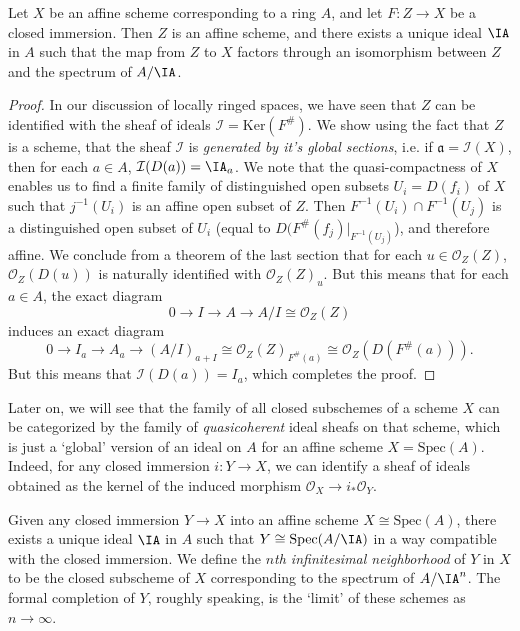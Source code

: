 \begin{theorem}
    Let $X$ be an affine scheme corresponding to a ring $A$, and let $F: Z \to X$ be a closed immersion. Then $Z$ is an affine scheme, and there exists a unique ideal $\IA$ in $A$ such that the map from $Z$ to $X$ factors through an isomorphism between $Z$ and the spectrum of $A/\IA$.
\end{theorem}
\begin{proof}
    In our discussion of locally ringed spaces, we have seen that $Z$ can be identified with the sheaf of ideals $\mathcal{I} = \text{Ker}(F^\#)$. We show using the fact that $Z$ is a scheme, that the sheaf $\mathcal{I}$ is \emph{generated by it's global sections}, i.e. if $\mathfrak{a} = \mathcal{I}(X)$, then for each $a \in A$, $\mathcal{I}(D(a)) = \IA_a$. We note that the quasi-compactness of $X$ enables us to find a finite family of distinguished open subsets $U_i = D(f_i)$ of $X$ such that $j^{-1}(U_i)$ is an affine open subset of $Z$. Then $F^{-1}(U_i) \cap F^{-1}(U_j)$ is a distinguished open subset of $U_i$ (equal to $D(F^\#(f_j)|_{F^{-1}(U_j)}$), and therefore affine. We conclude from a theorem of the last section that for each $u \in \mathcal{O}_Z(Z)$, $\mathcal{O}_Z(D(u))$ is naturally identified with $\mathcal{O}_Z(Z)_u$. But this means that for each $a \in A$, the exact diagram
    \[ 0 \to I \to A \to A/I \cong \mathcal{O}_Z(Z) \]
    induces an exact diagram
    \[ 0 \to I_a \to A_a \to (A/I)_{a + I} \cong \mathcal{O}_Z(Z)_{F^\#(a)} \cong \mathcal{O}_Z(D(F^\#(a))). \]
    But this means that $\mathcal{I}(D(a)) = I_a$, which completes the proof.
\end{proof}

\begin{remark}
    Later on, we will see that the family of all closed subschemes of a scheme $X$ can be categorized by the family of \emph{quasicoherent} ideal sheafs on that scheme, which is just a `global' version of an ideal on $A$ for an affine scheme $X = \text{Spec}(A)$. Indeed, for any closed immersion $i: Y \to X$, we can identify a sheaf of ideals obtained as the kernel of the induced morphism $\mathcal{O}_X \to i_* \mathcal{O}_Y$.
\end{remark}

\begin{example}
    Given any closed immersion $Y \to X$ into an affine scheme $X \cong \text{Spec}(A)$, there exists a unique ideal $\IA$ in $A$ such that $Y \cong \text{Spec}(A/\IA)$ in a way compatible with the closed immersion. We define the \emph{$n$th infinitesimal neighborhood} of $Y$ in $X$ to be the closed subscheme of $X$ corresponding to the spectrum of $A/\IA^n$. The formal completion of $Y$, roughly speaking, is the `limit' of these schemes as $n \to \infty$.
\end{example}


